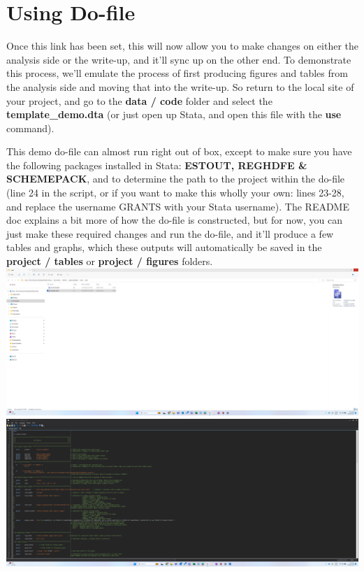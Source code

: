 \documentclass[12pt]{article}
\begin{document}
\section{Using Do-file}

Once this link has been set, this will now allow you to make changes on either the analysis side or the write-up, and it'll sync up on the other end. To demonstrate this process, we'll emulate the process of first producing figures and tables from the analysis side and moving that into the write-up. So return to the local site of your project, and go to the \textbf{data / code} folder and select the \textbf{template\_demo.dta} (or just open up Stata, and open this file with the \textbf{use} command).

This demo do-file can almost run right out of box, except to make sure you have the following packages installed in Stata: \textbf{ ESTOUT, REGHDFE \& SCHEMEPACK}, and to determine the path to the project within the do-file (line 24 in the script, or if you want to make this wholly your own: lines 23-28, and replace the username GRANTS with your Stata username). The README doc explains a bit more of how the do-file is constructed, but for now, you can just make these required changes and run the do-file, and it'll produce a few tables and graphs, which these outputs will automatically be saved in the \textbf{project / tables} or \textbf{project / figures} folders. \\

\includegraphics[width=1\textwidth]{Instructions/project_template_screenshots/project_template_13.png} \\

\includegraphics[width=1\textwidth]{Instructions/project_template_screenshots/project_template_14.png} \\
\end{document}
